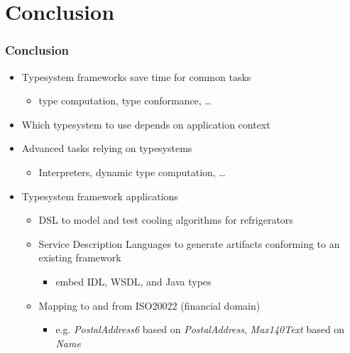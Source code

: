 \section{Conclusion}

\begin{frame}
  \frametitle{Conclusion}
  
  
  \begin{itemize}
    \item Typesystem frameworks save time for common tasks
    \begin{itemize}
      \item type computation, type conformance, \ldots
    \end{itemize}
    \item Which typesystem to use depends on application context
    \item Advanced tasks relying on typesystems
    \begin{itemize}
      \item Interpreters, dynamic type computation, \ldots
    \end{itemize}
    \item Typesystem framework applications
    \begin{itemize}
      \item DSL to model and test cooling algorithms for refrigerators 
      \item Service Description Languages to generate artifacts conforming
      to an existing framework
      \begin{itemize}
        \item embed IDL, WSDL, and Java types
      \end{itemize}
      \item Mapping to and from ISO20022 (financial domain)
      \begin{itemize}
        \item e.g. \emph{PostalAddress6} based on \emph{PostalAddress},
        \emph{Max140Text} based on \emph{Name}
      \end{itemize}
    \end{itemize}
  \end{itemize}
  
\end{frame}

